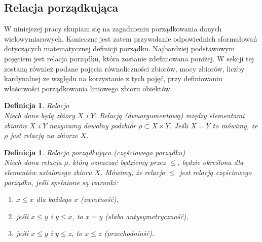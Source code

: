 \documentclass[12pt,a4paper]{report}
\newtheorem{definition}[theorem]{Definicja}
\begin{document}
\subsection{Relacja porządkująca}
\noindent

W niniejszej pracy skupiam się na zagadnieniu porządkowania danych wielowymiarowych. Konieczne jest zatem przywołanie odpowiednich sformułowań dotyczących matematycznej definicji porządku. Najbardziej podstawowym pojęciem jest relacja porządku, która zostanie zdefiniowana poniżej. W sekcji tej zostaną również podane pojęcia równoliczności zbiorów, mocy zbiorów, liczby kardynalnej ze względu na korzystanie z tych pojęć, przy definiowaniu właściwości porządkowania liniowego zbioru obiektów.


\begin{definition}{Relacja \cite[Rozdział 3]{kuratowski2004}\\}
Niech dane będą zbiory $X$ i $Y$. Relacją (dwuargumentową) między elementami zbiorów $X$ i $Y$ nazywamy dowolny podzbiór $\rho \subset X \times Y $. Jeśli $X=Y$ to mówimy, że $\rho$ jest relacją na zbiorze $X$. \\
\end{definition} 

\begin{definition}{Relacja porządkująca (częściowego porządku) \cite[Rozdział 2]{blaszczyk2007}\\}\label{def-relacja-czesciowego-porzadku}
Niech dana relacja $\rho$, którą oznaczać będziemy przez $\leq$, będzie określona dla elementów ustalonego zbioru $X$. Mówimy, że relacja $\leq$ jest relacją częściowego porządku, jeśli spełnione są warunki:
\begin{enumerate}
\item $x \leq x$ dla każdego $x$ (zwrotność),
\item jeśli $x \leq y$ i $y \leq x$, to $x=y$ (słaba antysymetryczność),
\item jeśli $x \leq y$ i $y \leq z$, to $x \leq z$ (przechodniość).\\
\end{enumerate}
\end{definition}
\end{document}
